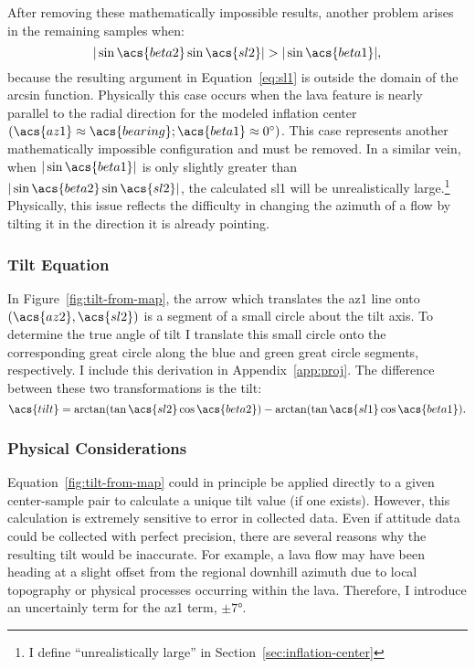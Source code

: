 After removing these mathematically impossible results, another problem arises in the remaining samples when:
\begin{equation}
     |\sin\acs{beta2}\sin\acs{sl2}| > |\sin\acs{beta1}|,\label{eq:domain-error}
\end{equation}
because the resulting argument in Equation~\eqref{eq:sl1} is outside the domain of the arcsin function. Physically this case occurs when the lava feature is nearly parallel to the radial direction for the modeled inflation center $(\acs{az1}\approx\acs{bearing}; \acs{beta1}\approx\ang{0})$. This case represents another mathematically impossible configuration and must be removed. In a similar vein, when $|\sin\acs{beta1}|$ is only slightly greater than $|\sin\acs{beta2}\sin\acs{sl2}|$, the calculated \acs{sl1} will be unrealistically large.\footnote{I define ``unrealistically large'' in Section~\ref{sec:inflation-center}} Physically, this issue reflects the difficulty in changing the azimuth of a flow by tilting it in the direction it is already pointing.

\subsubsection{Tilt Equation}

In Figure~\ref{fig:tilt-from-map}, the arrow which translates the \acs{az1} line onto $\left(\acs{az2},\acs{sl2}\right)$ is a segment of a small circle about the tilt axis. To determine the true angle of tilt I translate this small circle onto the corresponding great circle along the blue and green great circle segments, respectively. I include this derivation in Appendix~\ref{app:proj}. The difference between these two transformations is the tilt: 
\begin{equation}
    \acs{tilt} = \arctan(\tan\acs{sl2}\cos\acs{beta2}) - \arctan(\tan\acs{sl1}\cos\acs{beta1}).\label{eq:tilt-from-map}
\end{equation}

\subsubsection{Physical Considerations}

Equation~\eqref{fig:tilt-from-map} could in principle be applied directly to a given center-sample pair to calculate a unique tilt value (if one exists). However, this calculation is extremely sensitive to error in collected data. Even if attitude data could be collected with perfect precision, there are several reasons why the resulting tilt would be inaccurate. For example, a lava flow may have been heading at a slight offset from the regional downhill azimuth due to local topography or physical processes occurring within the lava. Therefore, I introduce an uncertainly term for the \acs{az1} term, $\pm\ang{7}$. 

